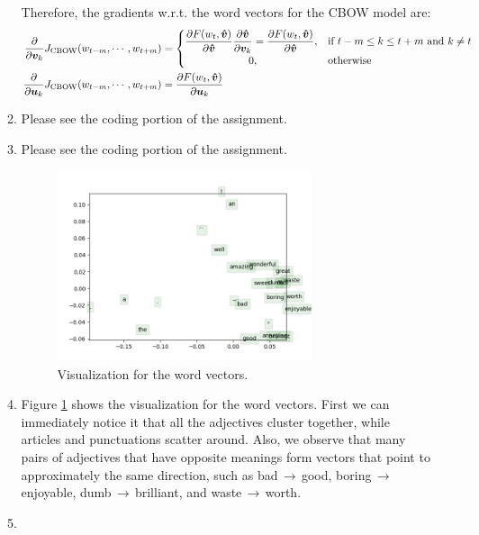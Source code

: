 \documentclass[10pt,reqno]{amsart}
\begin{document}
\begin{enumerate}[topsep=0pt,itemsep=2ex,partopsep=1ex,parsep=1ex]
\begin{enumerate}
    Therefore, the gradients w.r.t. the word vectors for the CBOW model are:
    \begin{align*}
      \frac{\partial}{\partial \bm{v}_k} J_\text{CBOW}(w_{t-m},\cdots,w_{t+m}) &= 
      \begin{cases}
        \displaystyle\frac{\partial F(w_t, \bm{\hat{v}})}{\partial \bm{\hat{v}}} \frac{\partial \bm{\hat{v}}}{\partial \bm{v}_k} 
        = \displaystyle\frac{\partial F(w_t, \bm{\hat{v}})}{\partial \bm{\hat{v}}} , & \text{if}\ t-m \leq k \leq t+m\ \text{and}\ k \neq t\\
        \qquad\qquad\qquad 0, & \text{otherwise}
      \end{cases}\\
      \frac{\partial}{\partial \bm{u}_k} J_\text{CBOW}(w_{t-m},\cdots,w_{t+m}) 
      &= \frac{\partial F(w_t, \bm{\hat{v}})}{\partial \bm{u}_k} 
    \end{align*}
    
  \item Please see the coding portion of the assignment.
  \item Please see the coding portion of the assignment.
    \begin{figure}[hb]
      \includegraphics[width=0.75\textwidth]{../code/q3_word_vectors.png}
      \caption{Visualization for the word vectors.}
      \label{fig1}
    \end{figure}
  \item
    Figure \ref{fig1} shows the visualization for the word vectors. 
    First we can immediately notice it that all the adjectives cluster together, 
    while articles and punctuations scatter around. 
    Also, we observe that many pairs of adjectives that have opposite meanings 
    form vectors that point to approximately the same direction, such as 
    bad$\,\to\,$good, 
    boring$\,\to\,$enjoyable,
    dumb$\,\to\,$brilliant, and
    waste$\,\to\,$worth.
  \item
  \end{enumerate}



\end{enumerate}
\end{document}
